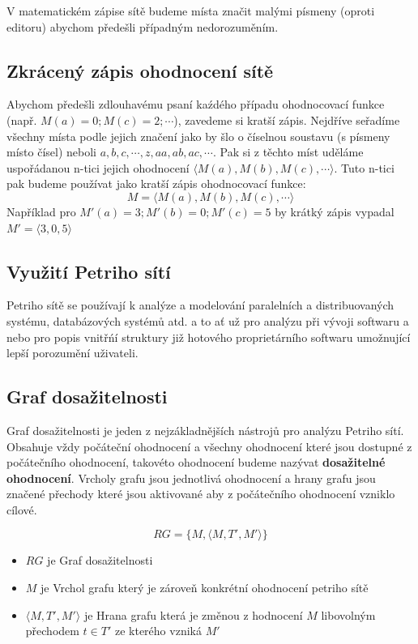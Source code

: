 \documentclass[
  biblatex,
  glossaries,
  index
]{kidiplom}
\begin{document}
V matematickém zápise sítě budeme místa značit malými písmeny (oproti editoru)
abychom předešli případným nedorozuměním.

\subsection{Zkrácený zápis ohodnocení sítě}

Abychom předešli zdlouhavému psaní kaźdého případu ohodnocovací funkce
\\(např. $M(a) = 0; M(c) = 2; \dotsb$), zavedeme si kratší zápis.
Nejdříve seřadíme všechny místa podle jejich značení jako by šlo 
o číselnou soustavu (s písmeny místo čísel) 
neboli $a, b, c, \dotsb, z, aa, ab, ac, \dotsb$.
Pak si z těchto míst uděláme uspořádanou n-tici jejich ohodnocení $\langle M(a), M(b), M(c), \dotsb \rangle$.
Tuto n-tici pak budeme používat jako kratší zápis ohodnocovací funkce:
$$
 M = \langle M(a), M(b), M(c), \dotsb \rangle
$$
Například pro $M'(a) = 3; M'(b) = 0; M'(c) = 5$ by krátký zápis vypadal
\\ $M' = \langle 3,0,5 \rangle$

\subsection{Využití Petriho sítí}

Petriho sítě se používají k analýze a modelování paralelních
a distribuovaných systému, databázových systémů atd. a to ať už
pro analýzu při vývoji softwaru a nebo pro popis vnitřńí struktury
již hotového proprietárního softwaru umožnující lepší porozumění uživateli.

\subsection{Graf dosažitelnosti}

Graf dosažitelnosti je jeden z nejzákladnějších nástrojů pro analýzu Petriho sítí.
Obsahuje vždy počáteční ohodnocení a všechny ohodnocení které jsou dostupné z počátečního ohodnocení, 
takovéto ohodnocení budeme nazývat \textbf{dosažitelné ohodnocení}. 
Vrcholy grafu jsou jednotlivá ohodnocení
a hrany grafu jsou značené přechody které jsou aktivované aby z počátečního ohodnocení vzniklo cílové.

\begin{definition}
  $$RG = \{M, \langle M, T', M' \rangle\}$$
  \begin{itemize}
    \item $RG$ je Graf dosažitelnosti
    \item $M$ je Vrchol grafu který je zároveň konkrétní ohodnocení petriho sítě
    \item $\langle M, T', M' \rangle$ je Hrana grafu která je změnou z hodnocení $M$ libovolným přechodem $t \in T'$ ze kterého vzniká $M'$
  \end{itemize}
\end{definition}
\end{document}
